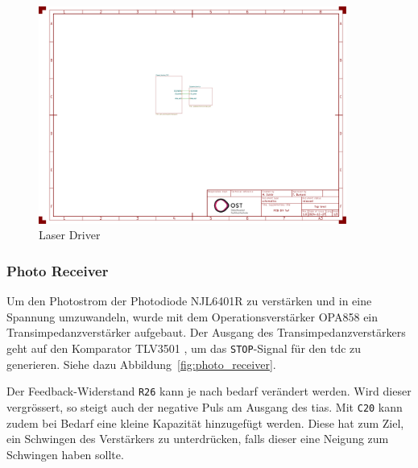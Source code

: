 
\begin{figure}[H]
    \centering
    \includegraphics[page=3, trim=100 520 550 60, clip, width=0.9\textwidth]{attachments/schematic.pdf}
    \caption{Laser Driver}\label{fig:laser_driver}
\end{figure}

\subsubsection{Photo Receiver}\label{sec:schematic_photo_receiver}

Um den Photostrom der Photodiode NJL6401R \cite{jrc2014njl6401r3_datasheet} zu verstärken und in eine Spannung umzuwandeln,
wurde mit dem Operationsverstärker OPA858 \cite{ti2018opa858_datasheet} ein Transimpedanzverstärker aufgebaut. Der
Ausgang des Transimpedanzverstärkers geht auf den Komparator TLV3501 \cite{ti2016tlv3501_datasheet}, um das \lstinline|STOP|-Signal
für den \acrshort{tdc} zu generieren. Siehe dazu Abbildung~\ref{fig:photo_receiver}.

Der Feedback-Widerstand \lstinline|R26| kann je nach bedarf verändert werden. Wird dieser vergrössert, so steigt auch der
negative Puls am Ausgang des \acrshort{tia}s. Mit \lstinline|C20| kann zudem bei Bedarf eine kleine Kapazität hinzugefügt
werden. Diese hat zum Ziel, ein Schwingen des Verstärkers zu unterdrücken, falls dieser eine Neigung zum Schwingen haben
sollte.

